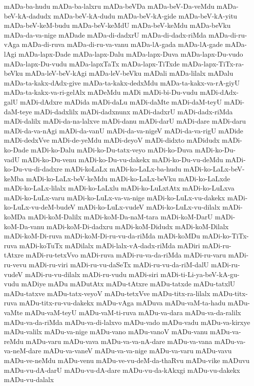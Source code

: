 {mADa-ba-hudu
mADa-ba-lalxru
mADa-beVDa
mADa-beV-Da-veMdu
mADa-beV-kA-dadudx
mADa-beV-kA-dudu
mADa-beV-kA-gide
mADa-beV-kA-yitu
mADa-beV-keM-budu
mADa-beV-keMdU
mADa-beV-keMdu
mADa-beVku
mADa-da-va-nige
mADade
mADa-di-dadxrU
mADa-di-dadx-riMda
mADa-di-ru-vAga
mADa-di-ruva
mADa-di-ru-va-vanu
mADa-lA-gada
mADa-lA-gade
mADa-lAgi
mADa-lapx-Dade
mADa-lapx-Dalu
mADa-lapx-Duva
mADa-lapx-Du-vudo
mADa-lapx-Du-vudu
mADa-lapxTaTx
mADa-lapx-TiTxde
mADa-lapx-TiTx-ra-beVku
mADa-leV-beV-kAgi
mADa-leV-beVku
mADali
mADa-lilalx
mADalu
mADa-ta-kakx-dAdx-give
mADa-ta-kakx-dedxMdu
mADa-ta-kakx-va-rA-giyU
mADa-ta-kakx-va-ri-gelAlx
mADeMdu
mADi
mADi-bi-Du-vudu
mADi-dAdx-galU
mADi-dAdxre
mADida
mADi-daLu
mADi-daMte
mADi-daM-teyU
mADi-daM-teye
mADi-dadxlilx
mADi-dadxnunx
mADi-dadxrU
mADi-dadx-riMda
mADi-dalilx
mADi-da-na-lalxve
mADi-danu
mADi-darU
mADi-dare
mADi-daru
mADi-da-va-nAgi
mADi-da-vanU
mADi-da-va-nigeV
mADi-da-va-rigU
mADide
mADi-dedxVve
mADi-de-yeMdu
mADi-deyoV
mADi-didxto
mADidudx
mADi-ko-Dade
mADi-ko-Dalu
mADi-ko-Du-tatx-veyo
mADi-ko-Duva
mADi-ko-Du-vadU
mADi-ko-Du-venu
mADi-ko-Du-vu-dakekx
mADi-ko-Du-vu-deMdu
mADi-ko-Du-vu-di-dadxre
mADi-koLaLx
mADi-ko-LaLx-ba-hudu
mADi-ko-LaLx-beV-keMba
mADi-ko-LaLx-beV-keMdu
mADi-ko-LaLx-beVku
mADi-ko-LaLxde
mADi-ko-LaLx-lilalx
mADi-ko-LaLxlu
mADi-ko-LuLxtAtx
mADi-ko-LuLxva
mADi-ko-LuLx-varu
mADi-ko-LuLx-va-va-nige
mADi-ko-LuLx-vu-dakekx
mADi-ko-LuLx-vu-deM-budeV
mADi-ko-LuLx-vudeV
mADi-ko-LuLx-vu-dilalx
mADi-koMDa
mADi-koM-Dalilx
mADi-koM-Da-naM-tara
mADi-koM-DarU
mADi-koM-Da-vanu
mADi-koM-Di-dadxru
mADi-koM-Didudx
mADi-koM-Dilalx
mADi-koM-Di-ruva
mADi-koM-Di-ru-vu-da-riMda
mADi-koMDu
mADi-ko-TiTx-ruva
mADi-koTuTx
mADilalx
mADi-lalx-vA-dadx-riMda
mADiri
mADi-ru-tAtxre
mADi-ru-tetxVvo
mADi-ruva
mADi-ru-va-da-riMda
mADi-ru-varu
mADi-ru-vevu
mADi-ru-viri
mADi-ru-vu-daSeTx
mADi-ru-vu-da-riM-dalU
mADi-ru-vudeV
mADi-ru-vu-dilalx
mADi-ru-vudu
mADi-siri
mADi-ti-Li-ya-beV-kA-gu-vudu
mADiye
mADu
mADutAtx
mADu-tAtxre
mADu-tatxde
mADu-tatxlU
mADu-tatxve
mADu-tatx-veyoV
mADu-tetxVve
mADu-titx-ra-lilalx
mADu-titx-ruva
mADu-titx-ru-vu-dakekx
mADu-vAga
mADuva
mADu-vaM-ta-hadu
mADu-vaMte
mADu-vaM-teyU
mADu-vaM-ti-ruva
mADu-va-dara
mADu-va-da-ralilx
mADu-va-da-riMda
mADu-va-di-lalxvo
mADu-vado
mADu-vadu
mADu-va-kirxye
mADu-valilx
mADu-va-nige
mADu-vano
mADu-vanoV
mADu-vanu
mADu-va-reMdu
mADu-varu
mADu-vava
mADu-va-va-nA-dare
mADu-va-vana
mADu-va-va-neM-dare
mADu-va-vaneV
mADu-va-va-nige
mADu-va-varu
mADu-vavu
mADu-ve-neMdu
mADu-venu
mADu-ve-vu-deM-da-thaRvu
mADu-vike
mADuvu
mADu-vu-dA-darU
mADu-vu-dA-dare
mADu-vu-da-kAkxgi
mADu-vu-dakekx
mADu-vu-dalalx
}
